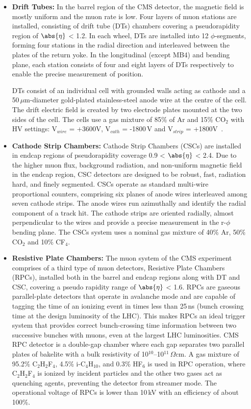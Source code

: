 \begin{itemize}
\item{\textbf{Drift Tubes:}}
In the barrel region of the CMS detector, the magnetic field is mostly uniform and the muon rate is low. Four layers of muon stations are installed, consisting of drift tube (DTs) chambers covering a pseudorapidity region of $\abs{\eta}$ < 1.2. In each wheel, DTs are installed into 12 $\phi$-segments, forming four stations in the radial direction and interleaved between the plates of the return yoke. In the longitudinal (except MB4) and bending plane, each station consists of four and eight layers of DTs respectively to enable the precise measurement of position.

DTs consist of an individual cell with grounded walls acting as cathode and a 50\,$\mu$m-diameter gold-plated stainless-steel anode wire at the centre of the cell. The drift electric field is created by two electrode plates mounted at the two sides of the cell. The cells use a gas mixture of 85\% of Ar and 15\% CO$_{2}$ with HV settings: V$_{wire}$ = +3600V, V$_{cath}$ = -1800\,V and V$_{strip}$ = +1800V~\cite{muon-sys}.  
\item{\textbf{Cathode Strip Chambers:}}
Cathode Strip Chambers (CSCs) are installed in endcap regions of pseudorapidity coverage 0.9 < $\abs{\eta}$ < 2.4. Due to the higher muon flux, background radiation, and non-uniform magnetic field in the endcap region, CSC detectors are designed to be robust, fast, radiation hard, and finely segmented. CSCs operate as standard multi-wire proportional counters, comprising six planes of anode wires interleaved among seven cathode strips. The anode wires run azimuthally and identify the radial component of a track hit. The cathode strips are oriented radially, almost perpendicular to the wires and provide a precise measurement in the r-$\phi$ bending plane. The CSCs system uses a nominal gas mixture of 40\% Ar, 50\% CO$_{2}$ and 10\% CF$_{4}$.

\item{\textbf{Resistive Plate Chambers:}}
The muon system of the CMS experiment comprises of a third type of muon detectors, Resistive Plate Chambers (RPCs), installed both in the barrel and endcap regions along with DT and CSC, covering a pseudo rapidity range of $\abs{\eta}$ < 1.6. RPCs are gaseous parallel-plate detectors that operate in avalanche mode and are capable of tagging the time of an ionizing event in times less than 25\,ns (bunch crossing time at the design luminosity of the LHC). This makes RPCs an ideal trigger system that provides correct bunch-crossing time information between two successive bunches with muons, even at the largest LHC luminosities.
CMS RPC detector is a double-gap chamber where each gap separates two parallel plates of bakelite with a bulk resistivity of 10$^{10}$–10$^{11}$\,$\Omega$cm. A gas mixture of 95.2\% C$_{2}$H$_{2}$F$_{4}$, 4.5\% i-C$_{4}$H$_{10}$, and 0.3\% HF$_{6}$ is used in RPC operation, where C$_{2}$H$_{2}$F$_{4}$ is ionized by incident particles and the other two gases act as quenching agents, preventing the detector from streamer mode. The operational voltage of RPCs is lower than 10\,kV with an efficiency of about 100\%. 
\end{itemize}
